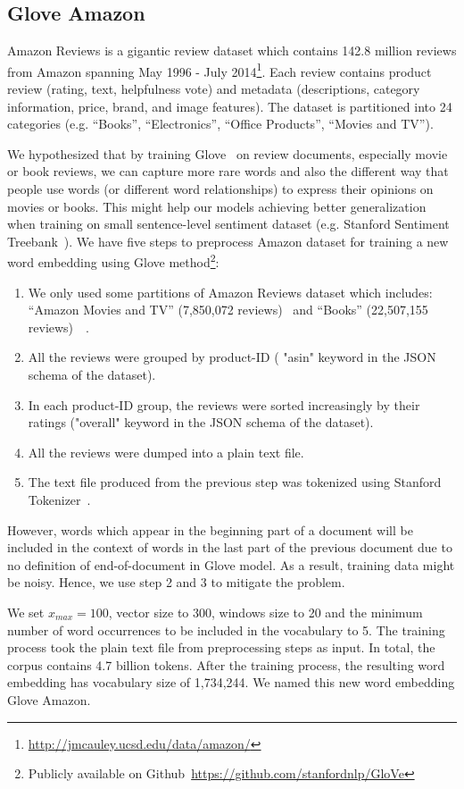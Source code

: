 \subsection{Glove Amazon}\label{sec:glove-amazon}
Amazon Reviews is a gigantic review dataset which contains 142.8 million reviews from Amazon spanning May 1996 - July 2014\footnote{\url{http://jmcauley.ucsd.edu/data/amazon/}}.
Each review contains product review (rating, text, helpfulness vote) and metadata (descriptions, category information, price, brand, and image features).
The dataset is partitioned into 24 categories (e.g. ``Books'', ``Electronics'', ``Office Products'', ``Movies and TV'').

We hypothesized that by training Glove~\cite{glove} on review documents, especially movie or book reviews, we can capture more rare words and also the different way that people use words (or different word relationships) to express their opinions on movies or books.
This might help our models achieving better generalization when training on small sentence-level sentiment dataset (e.g. Stanford Sentiment Treebank~\cite{socher2013recursive}).
We have five steps to preprocess Amazon dataset for training a new word embedding using Glove method\footnote{Publicly available on Github~\url{https://github.com/stanfordnlp/GloVe}}:
\begin{enumerate}
	\item We only used some partitions of Amazon Reviews dataset which includes:  ``Amazon Movies and TV'' (7,850,072 reviews)~\cite{mcauley2013hidden} and ``Books'' (22,507,155 reviews)~\cite{McAuleyTSH15}~\cite{HeM16}.
	\item All the reviews were grouped by product-ID ( "asin" keyword in the JSON schema of the dataset).
	\item In each product-ID group, the reviews were sorted increasingly by their ratings ("overall" keyword in the JSON schema of the dataset).
	\item All the reviews were dumped into a plain text file.
	\item The text file produced from the previous step was tokenized using Stanford Tokenizer~\cite{tokenizerpart}.
\end{enumerate}
However, words which appear in the beginning part of a document will be included in the context of words in the last part of the previous document due to no definition of end-of-document in Glove model. As a result, training data might be noisy. Hence, we use step 2 and 3 to mitigate the problem.

We set $x_{max} = 100$, vector size to 300, windows size to 20 and the minimum number of word occurrences to be included in the vocabulary to 5.
The training process took the plain text file from preprocessing steps as input.
In total, the corpus contains 4.7 billion tokens.
After the training process, the resulting word embedding has vocabulary size of 1,734,244.
We named this new word embedding Glove Amazon.

